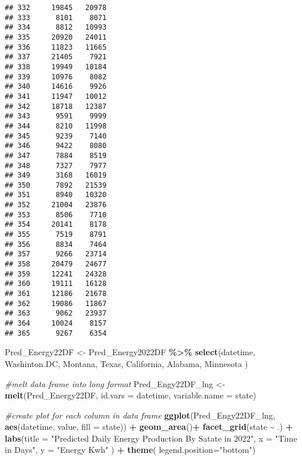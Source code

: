 \documentclass[
]{article}
\newenvironment{Shaded}{\begin{snugshade}}{\end{snugshade}}
\newcommand{\AttributeTok}[1]{\textcolor[rgb]{0.13,0.29,0.53}{#1}}
\newcommand{\CommentTok}[1]{\textcolor[rgb]{0.56,0.35,0.01}{\textit{#1}}}
\newcommand{\FunctionTok}[1]{\textcolor[rgb]{0.13,0.29,0.53}{\textbf{#1}}}
\newcommand{\NormalTok}[1]{#1}
\newcommand{\OtherTok}[1]{\textcolor[rgb]{0.56,0.35,0.01}{#1}}
\newcommand{\SpecialCharTok}[1]{\textcolor[rgb]{0.81,0.36,0.00}{\textbf{#1}}}
\newcommand{\StringTok}[1]{\textcolor[rgb]{0.31,0.60,0.02}{#1}}
\begin{document}
\begin{verbatim}
## 332     19845   20978
## 333      8101    8071
## 334      8812   10993
## 335     20920   24011
## 336     11823   11665
## 337     21405    7921
## 338     19949   10184
## 339     10976    8082
## 340     14616    9926
## 341     11947   10012
## 342     18718   12387
## 343      9591    9999
## 344      8210   11998
## 345      9239    7140
## 346      9422    8080
## 347      7884    8519
## 348      7327    7977
## 349      3168   16019
## 350      7892   21539
## 351      8940   10320
## 352     21004   23876
## 353      8506    7710
## 354     20141    8178
## 355      7519    8791
## 356      8834    7464
## 357      9266   23714
## 358     20479   24677
## 359     12241   24328
## 360     19111   16128
## 361     12186   21678
## 362     19086   11867
## 363      9062   23937
## 364     10024    8157
## 365      9267    6354
\end{verbatim}

\begin{Shaded}
\begin{Highlighting}[]
\NormalTok{Pred\_Energy22DF }\OtherTok{\textless{}{-}}\NormalTok{ Pred\_Energy2022DF }\SpecialCharTok{\%\textgreater{}\%}
  \FunctionTok{select}\NormalTok{(datetime, Washinton.DC, Montana, }
\NormalTok{         Texas, California,}
\NormalTok{         Alabama, Minnesota ) }

\CommentTok{\#melt data frame into long format}
\NormalTok{Pred\_Engy22DF\_lng }\OtherTok{\textless{}{-}} \FunctionTok{melt}\NormalTok{(Pred\_Energy22DF,  }
                          \AttributeTok{id.vars =} \StringTok{\textquotesingle{}datetime\textquotesingle{}}\NormalTok{, }
                          \AttributeTok{variable.name =} \StringTok{\textquotesingle{}state\textquotesingle{}}\NormalTok{)}

\CommentTok{\#create  plot for each column in data frame}
\FunctionTok{ggplot}\NormalTok{(Pred\_Engy22DF\_lng, }\FunctionTok{aes}\NormalTok{(datetime, }
\NormalTok{                              value, }
                              \AttributeTok{fill =}\NormalTok{ state)) }\SpecialCharTok{+}
  \FunctionTok{geom\_area}\NormalTok{()}\SpecialCharTok{+}
  \FunctionTok{facet\_grid}\NormalTok{(state }\SpecialCharTok{\textasciitilde{}}\NormalTok{ .) }\SpecialCharTok{+}
  \FunctionTok{labs}\NormalTok{(}\AttributeTok{title =} \StringTok{"Predicted Daily Energy Production By Satate in 2022"}\NormalTok{,}
       \AttributeTok{x =} \StringTok{"Time in Days"}\NormalTok{, }
       \AttributeTok{y =} \StringTok{"Energy Kwh"}\NormalTok{ ) }\SpecialCharTok{+}
  \FunctionTok{theme}\NormalTok{(}
    \AttributeTok{legend.position=}\StringTok{"bottom"}\NormalTok{)}
\end{Highlighting}
\end{Shaded}
\end{document}
